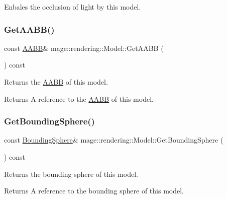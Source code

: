 Enbales the occlusion of light by this model. \mbox{\label{classmage_1_1rendering_1_1_model_a05a767ef1551aa4c09c223d8f2311855}} 
\subsubsection{\texorpdfstring{Get\+A\+A\+B\+B()}{GetAABB()}}
{\footnotesize\ttfamily const \mbox{\hyperlink{classmage_1_1_a_a_b_b}{A\+A\+BB}}\& mage\+::rendering\+::\+Model\+::\+Get\+A\+A\+BB (\begin{DoxyParamCaption}{ }\end{DoxyParamCaption}) const\hspace{0.3cm}{\ttfamily [noexcept]}}

Returns the \mbox{\hyperlink{classmage_1_1_a_a_b_b}{A\+A\+BB}} of this model.

\begin{DoxyReturn}{Returns}
A reference to the \mbox{\hyperlink{classmage_1_1_a_a_b_b}{A\+A\+BB}} of this model. 
\end{DoxyReturn}
\mbox{\label{classmage_1_1rendering_1_1_model_a8885748932b52ec2d5bde368db6a130d}} 
\subsubsection{\texorpdfstring{Get\+Bounding\+Sphere()}{GetBoundingSphere()}}
{\footnotesize\ttfamily const \mbox{\hyperlink{classmage_1_1_bounding_sphere}{Bounding\+Sphere}}\& mage\+::rendering\+::\+Model\+::\+Get\+Bounding\+Sphere (\begin{DoxyParamCaption}{ }\end{DoxyParamCaption}) const\hspace{0.3cm}{\ttfamily [noexcept]}}

Returns the bounding sphere of this model.

\begin{DoxyReturn}{Returns}
A reference to the bounding sphere of this model. 
\end{DoxyReturn}
\mbox{\label{classmage_1_1rendering_1_1_model_af6e23f8327e82af4d6c2aa854329608c}} 
